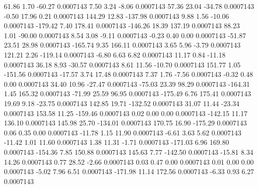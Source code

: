        61.86        1.70      -60.27     0.0007143
        7.50        3.24       -8.06     0.0007143
       57.36       23.04      -34.78     0.0007143
       -0.50       17.96        0.21     0.0007143
      144.29       12.83     -137.98     0.0007143
        9.88        1.56      -10.06     0.0007143
     -179.42        7.40      178.41     0.0007143
     -146.26       18.39      137.19     0.0007143
       88.23        1.01      -90.00     0.0007143
        8.54        3.08       -9.11     0.0007143
       -0.23        0.40        0.00     0.0007143
      -51.87       23.51       28.98     0.0007143
     -165.74        9.35      166.11     0.0007143
        3.65        5.96       -3.79     0.0007143
      121.21        2.26     -119.14     0.0007143
       -6.80        6.63        6.82     0.0007143
       11.17        0.84      -11.18     0.0007143
       36.18        8.93      -30.57     0.0007143
        8.61       11.56      -10.70     0.0007143
      151.77        1.05     -151.56     0.0007143
      -17.57        3.74       17.48     0.0007143
        7.37        1.76       -7.56     0.0007143
       -0.32        0.48        0.00     0.0007143
       34.40       10.96      -27.47     0.0007143
      -75.03       23.39       98.29     0.0007143
     -164.31        1.45      165.32     0.0007143
      -71.99       25.59       96.95     0.0007143
     -175.49        6.76      175.41     0.0007143
       19.69        9.18      -23.75     0.0007143
      142.85       19.71     -132.52     0.0007143
       31.07       11.44      -23.34     0.0007143
      153.58       11.25     -159.46     0.0007143
        0.02        0.00        0.00     0.0007143
     -142.15       11.17      136.10     0.0007143
      145.98       25.70     -134.01     0.0007143
      170.75       16.90     -175.29     0.0007143
        0.06        0.35        0.00     0.0007143
      -11.78        1.15       11.90     0.0007143
       -6.61        3.63        5.62     0.0007143
      -11.42        1.01       11.60     0.0007143
        1.38       11.31       -1.71     0.0007143
     -171.03        6.96      169.80     0.0007143
     -154.36        7.85      150.88     0.0007143
      145.63        7.77     -142.50     0.0007143
      -15.81        8.34       14.26     0.0007143
        0.77       28.52       -2.66     0.0007143
        0.03        0.47        0.00     0.0007143
        0.01        0.00        0.00     0.0007143
       -5.02        7.96        6.51     0.0007143
     -171.98       11.14      172.56     0.0007143
       -6.33        0.93        6.27     0.0007143
